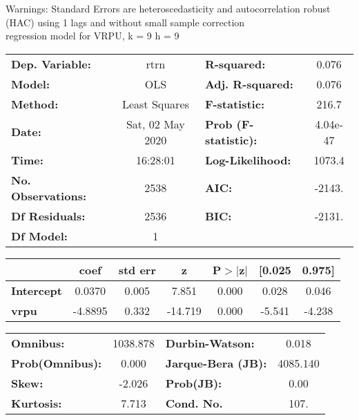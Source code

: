 Warnings: \newline
 [1] Standard Errors are heteroscedasticity and autocorrelation robust (HAC) using 1 lags and without small sample correction\\ 

regression model for VRPU, k = 9 h = 9\begin{center}
\begin{tabular}{lclc}
\toprule
\textbf{Dep. Variable:}    &       rtrn       & \textbf{  R-squared:         } &     0.076   \\
\textbf{Model:}            &       OLS        & \textbf{  Adj. R-squared:    } &     0.076   \\
\textbf{Method:}           &  Least Squares   & \textbf{  F-statistic:       } &     216.7   \\
\textbf{Date:}             & Sat, 02 May 2020 & \textbf{  Prob (F-statistic):} &  4.04e-47   \\
\textbf{Time:}             &     16:28:01     & \textbf{  Log-Likelihood:    } &    1073.4   \\
\textbf{No. Observations:} &        2538      & \textbf{  AIC:               } &    -2143.   \\
\textbf{Df Residuals:}     &        2536      & \textbf{  BIC:               } &    -2131.   \\
\textbf{Df Model:}         &           1      & \textbf{                     } &             \\
\bottomrule
\end{tabular}
\begin{tabular}{lcccccc}
                   & \textbf{coef} & \textbf{std err} & \textbf{z} & \textbf{P$> |$z$|$} & \textbf{[0.025} & \textbf{0.975]}  \\
\midrule
\textbf{Intercept} &       0.0370  &        0.005     &     7.851  &         0.000        &        0.028    &        0.046     \\
\textbf{vrpu}      &      -4.8895  &        0.332     &   -14.719  &         0.000        &       -5.541    &       -4.238     \\
\bottomrule
\end{tabular}
\begin{tabular}{lclc}
\textbf{Omnibus:}       & 1038.878 & \textbf{  Durbin-Watson:     } &    0.018  \\
\textbf{Prob(Omnibus):} &   0.000  & \textbf{  Jarque-Bera (JB):  } & 4085.140  \\
\textbf{Skew:}          &  -2.026  & \textbf{  Prob(JB):          } &     0.00  \\
\textbf{Kurtosis:}      &   7.713  & \textbf{  Cond. No.          } &     107.  \\
\bottomrule
\end{tabular}
\end{center}

